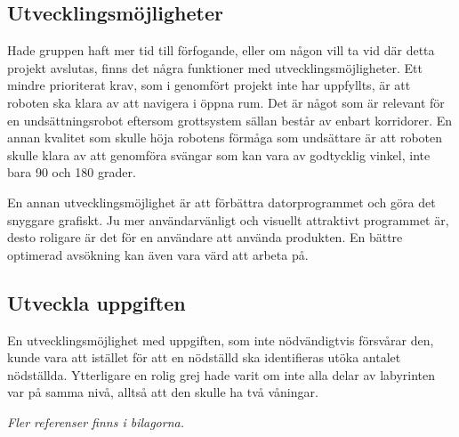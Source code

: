 \documentclass[11pt]{article}
\begin{document}
\begin{flushleft}
\subsection{Utvecklingsmöjligheter}
Hade gruppen haft mer tid till förfogande, eller om någon vill ta vid där detta projekt avslutas, finns det några funktioner med utvecklingsmöjligheter. Ett mindre prioriterat krav, som i genomfört projekt inte har uppfyllts, är att roboten ska klara av att navigera i öppna rum. Det är något som är relevant för en undsättningsrobot eftersom grottsystem sällan består av enbart korridorer. En annan kvalitet som skulle höja robotens förmåga som undsättare är att roboten skulle klara av att genomföra svängar som kan vara av godtycklig vinkel, inte bara 90 och 180 grader. 

En annan utvecklingsmöjlighet är att förbättra datorprogrammet och göra det snyggare grafiskt. Ju mer användarvänligt och visuellt attraktivt programmet är, desto roligare är det för en användare att använda produkten. En bättre optimerad avsökning kan även vara värd att arbeta på.

\subsection{Utveckla uppgiften}
En utvecklingsmöjlighet med uppgiften, som inte nödvändigtvis försvårar den, kunde vara att istället för att en nödställd ska identifieras utöka antalet nödställda. Ytterligare en rolig grej hade varit om inte alla delar av labyrinten var på samma nivå, alltså att den skulle ha två våningar. 

\pagebreak




\textit{Fler referenser finns i bilagorna.}

\pagebreak


\appendix

\end{flushleft}
\end{document}
